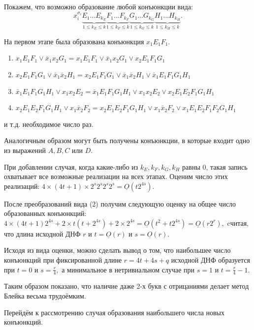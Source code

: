 \documentclass[12pt,a4paper,oneside,fleqn,leqno]{article}
\theoremstyle{definition}
\begin{document}
			Покажем, что возможно образование любой конъюнкции вида:
			$$
			x_i^{\sigma_i} \underbrace{E_1\ldots E_{k_E}}_{1\leqslant k_E \leqslant k}\underbrace{F_1\ldots F_{k_F}}_{1\leqslant k_F \leqslant k}\underbrace{G_1\ldots G_{k_G}}_{1\leqslant k_G \leqslant k}\underbrace{H_1\ldots H_{k_H}}_{1\leqslant k_H \leqslant k}.$$\par
			На первом этапе была образована конъюнкция $x_1E_1F_1.$
			\begin{enumerate}\itemsep=0pt
				\item
				$x_1E_1F_1 \vee \bar{x}_1x_2G_1 = x_1E_1F_1 \vee \bar{x}_1x_2G_1 \vee x_2E_1F_1G_1$
				\item
				$x_2E_1F_1G_1 \vee \bar{x}_1\bar{x}_2H_1 = x_2E_1F_1G_1 \vee \bar{x}_1\bar{x}_2H_1 \vee \bar{x}_1E_1F_1G_1H_1$
				\item
				$\bar{x}_1E_1F_1G_1H_1 \vee x_1x_2E_2 = \bar{x}_1E_1F_1G_1H_1 \vee x_1x_2E_2 \vee x_2E_1E_2F_1G_1H_1$
				\item
				$x_2E_1E_2F_1G_1H_1 \vee x_1\bar{x}_2F_2 = x_2E_1E_2F_1G_1H_1 \vee x_1\bar{x}_2F_2 \vee x_1E_1E_2F_1F_2G_1H_1$
			\end{enumerate}
			и т.д. необходимое число раз.\par
			Аналогичным образом могут быть получены конъюнкции, в которые входит одно из выражений $A, B, C$ или $D.$\par
			При добавлении случая, когда какие-либо из $k_E, k_F, k_G, k_H$ равны 0, такая запись охватывает все возможные реализации на всех этапах. Оценим число этих реализаций: $4 \times (4t + 1) \times 2^s2^s2^s2^s = \underline{O}(t2^{4s}).$\par
			После преобразований вида (2) получим следующую оценку на общее число образованных конъюнкций: $4\times (4t + 1)2^{4s} + 2\times t(t + 2^{4s}) + 2\times 2^{4s} = \underline{O}(t^2 + t2^{4s}) = \underline{O}(r2^r),$ cчитая, что длина исходной ДНФ $r$ и $t = \underline{O}(r)$ и $s = \underline{O}(r).$ \par
			Исходя из вида оценки, можно сделать вывод о том, что наибольшее число конъюнкций при фиксированной длине $r = 4t + 4s + q$ исходной ДНФ образуется при $t = 0$ и $s = \frac{r}{4},$ а минимальное в нетривиальном случае при $s = 1$ и $t = \frac{r}{4} - 1.$\par
			Таким образом показано, что наличие даже 2-х букв с отрицаниями делает метод Блейка весьма трудоёмким.\par
			Перейдём к рассмотрению случая образования наибольшего числа новых конъюнкций.\par
\end{document}
